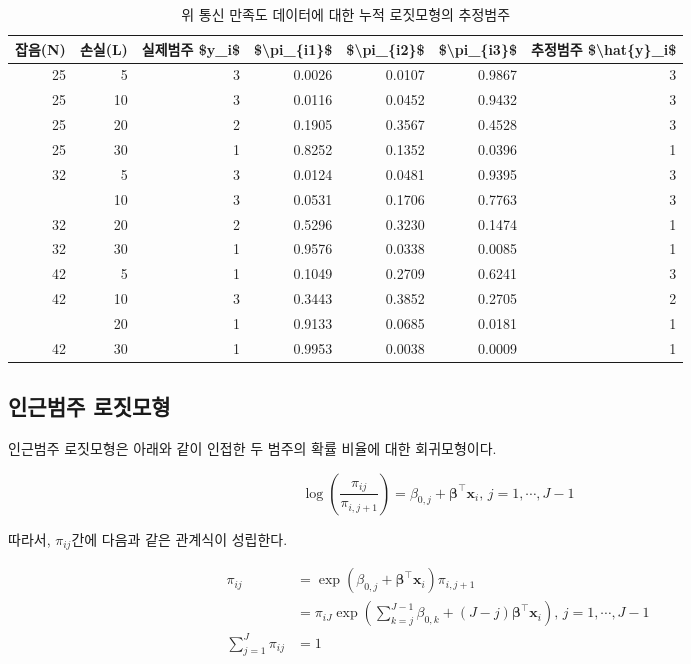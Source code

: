 \documentclass[
]{book}
\begin{document}
\begin{table}

\caption{\label{tab:cumulative-logit-prediction}위 통신 만족도 데이터에 대한 누적 로짓모형의 추정범주}
\centering
\begin{tabular}[t]{rrrrrrr}
\toprule
잡음(N) & 손실(L) & 실제범주 \$y\_i\$ & \$\textbackslash{}pi\_\{i1\}\$ & \$\textbackslash{}pi\_\{i2\}\$ & \$\textbackslash{}pi\_\{i3\}\$ & 추정범주 \$\textbackslash{}hat\{y\}\_i\$\\
\midrule
25 & 5 & 3 & 0.0026 & 0.0107 & 0.9867 & 3\\
25 & 10 & 3 & 0.0116 & 0.0452 & 0.9432 & 3\\
25 & 20 & 2 & 0.1905 & 0.3567 & 0.4528 & 3\\
25 & 30 & 1 & 0.8252 & 0.1352 & 0.0396 & 1\\
32 & 5 & 3 & 0.0124 & 0.0481 & 0.9395 & 3\\
\addlinespace
32 & 10 & 3 & 0.0531 & 0.1706 & 0.7763 & 3\\
32 & 20 & 2 & 0.5296 & 0.3230 & 0.1474 & 1\\
32 & 30 & 1 & 0.9576 & 0.0338 & 0.0085 & 1\\
42 & 5 & 1 & 0.1049 & 0.2709 & 0.6241 & 3\\
42 & 10 & 3 & 0.3443 & 0.3852 & 0.2705 & 2\\
\addlinespace
42 & 20 & 1 & 0.9133 & 0.0685 & 0.0181 & 1\\
42 & 30 & 1 & 0.9953 & 0.0038 & 0.0009 & 1\\
\bottomrule
\end{tabular}
\end{table}

\hypertarget{adjacent-categories-logit-model}{%
\subsection{인근범주 로짓모형}\label{adjacent-categories-logit-model}}

인근범주 로짓모형은 아래와 같이 인접한 두 범주의 확률 비율에 대한 회귀모형이다.

\begin{equation}
\log \left( \frac{\pi_{ij}}{\pi_{i,j+1}} \right) = \beta_{0,j} + \boldsymbol\beta^\top \mathbf{x}_i, \, j = 1, \cdots, J - 1
\label{eq:adjacent-category-logit}
\end{equation}

따라서, \(\pi_{ij}\)간에 다음과 같은 관계식이 성립한다.

\begin{equation*}
\begin{split}
\pi_{ij} &= \exp (\beta_{0,j} + \boldsymbol\beta^\top \mathbf{x}_i) \pi_{i,j+1}\\
&= \pi_{iJ} \exp \left(\sum_{k = j}^{J - 1} \beta_{0,k} + (J - j) \boldsymbol\beta^\top \mathbf{x}_i\right), \, j = 1, \cdots, J-1\\
\sum_{j = 1}^{J} \pi_{ij} &= 1
\end{split}
\end{equation*}
\end{document}
